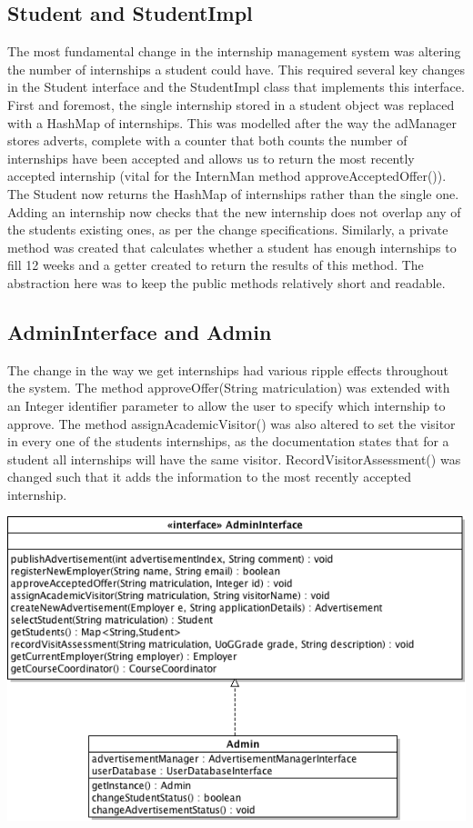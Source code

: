 \documentclass[11pt]{l3deliverable}
\begin{document}
\subsection{Student and StudentImpl}

The most fundamental change in the internship management system was altering the
number of internships a student could have. This required several key changes
in the Student interface and the StudentImpl class that implements this interface.
First and foremost, the single internship stored in a student object was replaced 
with a HashMap of internships. This was modelled after the way the adManager stores
adverts, complete with a counter that both counts the number of internships have been 
accepted and allows us to return the most recently accepted internship (vital for the 
InternMan method approveAcceptedOffer()). The Student now returns the HashMap of 
internships rather than the single one. Adding an internship now checks that the new
internship does not overlap any of the students existing ones, as per the change 
specifications. Similarly, a private method was created that calculates whether a
student has enough internships to fill 12 weeks and a getter created to return the 
results of this method. The abstraction here was to keep the public methods relatively
short and readable.

\subsection{AdminInterface and Admin}

The change in the way we get internships had various ripple effects throughout the 
system. The method approveOffer(String matriculation) was extended with an Integer
identifier parameter to allow the user to specify which internship to approve. The 
method assignAcademicVisitor() was also altered to set the visitor in every one of
the students internships, as the documentation states that for a student all 
internships will have the same visitor. RecordVisitorAssessment() was changed such
that it adds the information to the most recently accepted internship.

\includegraphics[width=\textwidth]{adminClassDiagram.png}
\end{document}
